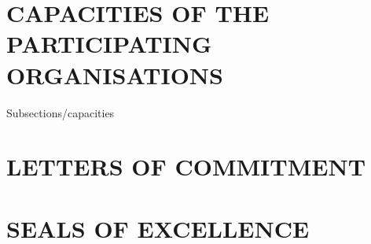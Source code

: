 \documentclass[11pt,a4paper]{article}
\begin{document}
\section*{CAPACITIES OF THE PARTICIPATING ORGANISATIONS}
 {Subsections/capacities}
\label{sec:capacities}
%
%
%
\clearpage
\section*{LETTERS OF COMMITMENT}
%
%


%
%
%
%
%
%
%
%
%
%
%
%
%

\clearpage
\section*{SEALS OF EXCELLENCE}


\end{document}
